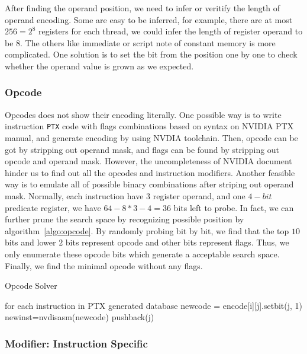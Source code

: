 After finding the operand position, we need to infer or veritify the length of operand encoding. Some are easy to be
inferred, for example, there are at most $256=2^{8}$ registers for each thread, we could infer the length of register operand to be $8$.
The others like immediate or script note of constant memory is more complicated. One solution is to set the bit from the
position one by one to check whether the operand value is grown as we expected.

\subsubsection{Opcode}
Opcodes does not show their encoding literally. One possible way is to write instruction {\tt PTX} code with flags
combinations based on syntax on NVIDIA PTX manual, and generate encoding by using NVDIA toolchain.
Then, opcode can be got by stripping out operand mask, and flags can be found by stripping out opcode and operand mask. However, the uncompleteness of NVIDIA document hinder us to find out all the opcodes and instruction modifiers. Another feasible way is to emulate all of possible binary combinations after striping out operand mask.
Normally, each instruction have $3$ register operand, and one $4-bit$ predicate register, we have $64-8*3-4=36$ bits left to probe.
In fact, we can further prune the search space by recognizing possible position by algorithm~\ref{algo:opcode}. By randomly probing bit by bit, we find that the top $10$ bits and lower $2$ bits represent opcode and other bits represent flags. Thus, we only enumerate these opcode bits which generate a acceptable search space. Finally, we find the minimal opcode without any flags. 


\begin{algorithm}
      \caption{Opcode Solver}\label{algo:opcode}
  \begin{algorithmic}[1]
      \State for each instruction in PTX generated database
      \State newcode = encode[i][j].setbit(j, 1)
      \State newinst=nvdisasm(newcode)
      \State pushback(j)
      \EndIf
      \EndIf
      \EndFor
      \EndFor
  \end{algorithmic}
\end{algorithm}

\subsubsection{Modifier: Instruction Specific}

